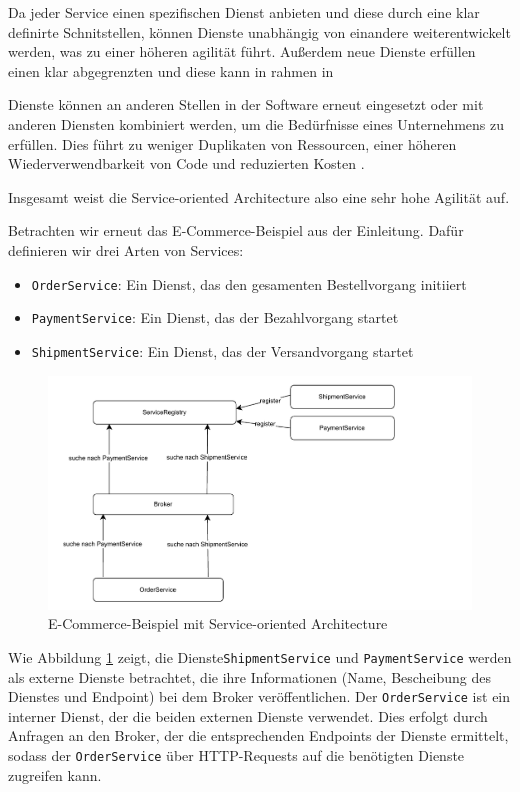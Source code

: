 \documentclass[acmtog]{acmart}
\begin{document}
Da jeder Service einen spezifischen Dienst anbieten und diese durch eine
 klar definirte Schnitstellen, können Dienste unabhängig von einandere 
 weiterentwickelt werden, was zu einer höheren agilität führt.
Außerdem neue Dienste erfüllen einen klar abgegrenzten  und diese kann 
in rahmen in 

Dienste können an anderen Stellen in der Software erneut eingesetzt oder 
mit anderen Diensten kombiniert werden, um die Bedürfnisse eines Unternehmens
zu erfüllen. Dies führt zu weniger Duplikaten von Ressourcen, einer höheren 
Wiederverwendbarkeit von Code und reduzierten Kosten \cite{soa4}.

Insgesamt weist die Service-oriented Architecture also eine sehr hohe Agilität auf.

Betrachten wir erneut das E-Commerce-Beispiel aus der Einleitung.
Dafür definieren wir drei Arten von Services:
\begin{itemize}
  \item \texttt{OrderService}: Ein Dienst, das den gesamenten Bestellvorgang initiiert
  \item \texttt{PaymentService}: Ein Dienst, das der Bezahlvorgang startet
  \item \texttt{ShipmentService}: Ein Dienst, das der Versandvorgang startet
\end{itemize}


\begin{figure}[!h]
  \centering
  \includegraphics[width=0.8\linewidth]{images/soa/soa-example.pdf}
  \caption{E-Commerce-Beispiel mit Service-oriented Architecture}
  \label{fig:soaecommerce}
\end{figure}

Wie Abbildung \ref{fig:soaecommerce} zeigt, die Dienste\texttt{ShipmentService} 
und \texttt{PaymentService} werden als externe Dienste betrachtet, die ihre Informationen 
(Name, Bescheibung des Dienstes und Endpoint) bei dem Broker veröffentlichen.
Der \texttt{OrderService} ist ein interner Dienst, der die beiden externen Dienste
 verwendet. Dies erfolgt durch Anfragen an den Broker, der die entsprechenden Endpoints
 der Dienste ermittelt, sodass der \texttt{OrderService} über HTTP-Requests auf die benötigten 
 Dienste zugreifen kann.
\end{document}
